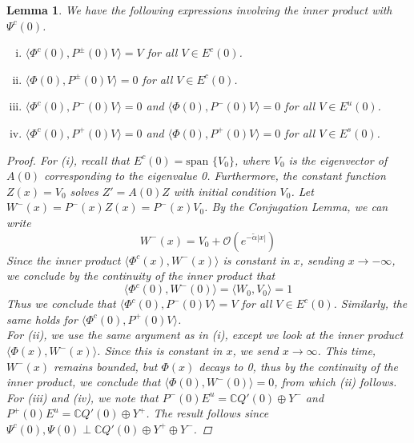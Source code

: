 \documentclass[12pt]{article}
\def\C{{\mathbb C}}
\newtheorem{lemma}{Lemma}
\begin{document}
\begin{lemma}\label{PsiIP}
We have the following expressions involving the inner product with $\Psi^c(0)$.
\begin{enumerate}[(i)]
	\item $\langle \Phi^c(0), P^\pm(0) V \rangle = V$ for all $V \in E^c(0)$.
	\item $\langle \Phi(0), P^\pm(0) V \rangle = 0$ for all $V \in E^c(0)$.
	\item $\langle \Phi^c(0), P^-(0) V \rangle = 0$ and $\langle \Phi(0), P^-(0) V \rangle = 0$ for all $V \in E^u(0)$.
	\item $\langle \Phi^c(0), P^+(0) V \rangle = 0$ and $\langle \Phi(0), P^+(0) V \rangle = 0$ for all $V \in E^s(0)$.
\end{enumerate}
\begin{proof}
For (i), recall that $E^c(0) = \text{span }\{ V_0 \}$, where $V_0$ is the eigenvector of $A(0)$ corresponding to the eigenvalue 0. Furthermore, the constant function $Z(x) = V_0$ solves $Z' = A(0) Z$ with initial condition $V_0$. Let $W^-(x) = P^-(x) Z(x) = P^-(x) V_0$. By the Conjugation Lemma, we can write
\[
W^-(x) = V_0 + \mathcal{O}({e^{-\tilde{\alpha}|x|}})
\]
Since the inner product $\langle \Phi^c(x), W^-(x) \rangle$ is constant in $x$, sending $x \rightarrow -\infty$, we conclude by the continuity of the inner product that
\[
\langle \Phi^c(0), W^-(0) \rangle = \langle W_0, V_0 \rangle = 1 
\]
Thus we conclude that $\langle \Phi^c(0), P^-(0) V \rangle = V$ for all $V \in E^c(0)$. Similarly, the same holds for $\langle \Phi^c(0), P^+(0) V \rangle$.\\

For (ii), we use the same argument as in (i), except we look at the inner product $\langle \Phi(x), W^-(x) \rangle$. Since this is constant in $x$, we send $x \rightarrow \infty$. This time, $W^-(x)$ remains bounded, but $\Phi(x)$ decays to 0, thus by the continuity of the inner product, we conclude that $\langle \Phi(0), W^-(0) \rangle = 0$, from which (ii) follows.\\

For (iii) and (iv), we note that $P^-(0)E^u = \C Q'(0) \oplus Y^-$ and $P^+(0)E^u = \C Q'(0) \oplus Y^+$. The result follows since $\Psi^c(0), \Psi(0) \perp \C Q'(0) \oplus Y^+ \oplus Y^-$.
\end{proof}
\end{lemma}

\end{document}
